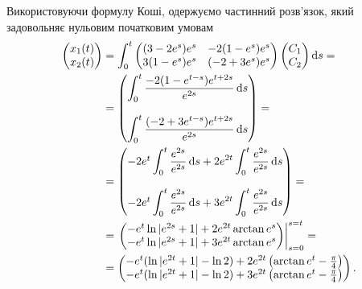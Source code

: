 \begin{solution}
	Використовуючи формулу Коші, одержуємо частинний розв'язок, який задовольняє нульовим початковим умовам
	\begin{align*}
		\begin{pmatrix} x_1(t) \\ x_2(t) \end{pmatrix} &= \int_0^t \begin{pmatrix} (3 - 2 e^s) e^s & -2 (1 - e^s) e^s \\ 3 (1 - e^s) e^s & (-2 + 3 e^s) e^s \end{pmatrix} \begin{pmatrix} C_1 \\ C_2 \end{pmatrix} \mathop{}\!\mathrm{d} s = \\
		&= \begin{pmatrix} \displaystyle \int_0^t \frac{-2 (1 - e^{t - s}) e^{t + 2 s}}{e^{2 s}} \mathop{}\!\mathrm{d} s \\ \\ \displaystyle  \int_0^t \frac{(-2 +3 e^{t - s}) e^{t + 2 s}}{e^{2 s}} \mathop{}\!\mathrm{d} s \end{pmatrix} = \\
		&= \begin{pmatrix} - 2 e^t \displaystyle \int_0^t \frac{e^{2 s}}{e^{2 s}} \mathop{}\!\mathrm{d} s + 2 e^{2 t} \displaystyle \int_0^t \frac{e^{2 s}}{e^{2 s}} \mathop{}\!\mathrm{d} s \\ \\ - 2 e^t \displaystyle \int_0^t \frac{e^{2 s}}{e^{2 s}} \mathop{}\!\mathrm{d} s + 3 e^{2 t} \displaystyle \int_0^t \frac{e^{2 s}}{e^{2 s}} \mathop{}\!\mathrm{d} s \end{pmatrix} = \\
		&= \left. \begin{pmatrix} -e^t \ln |e^{2 s} + 1| + 2 e^{2 t} \arctan e^s \\ -e^t \ln |e^{2 s} + 1| + 3 e^{2 t} \arctan e^s \end{pmatrix} \right|_{s = 0}^{s = t} = \\
		&= \begin{pmatrix} -e^t (\ln |e^{2 t} + 1| - \ln 2) + 2 e^{2 t} \left( \arctan e^t - \frac\pi4 \right) \\ -e^t (\ln |e^{2 t} + 1| - \ln 2) + 3 e^{2 t} \left( \arctan e^t - \frac\pi4 \right) \end{pmatrix}.
	\end{align*}


\end{solution}
